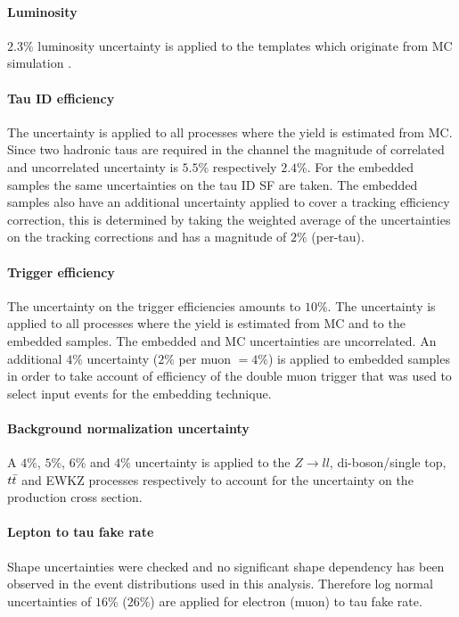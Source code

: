 \paragraph{Luminosity} $2.3 \%$ luminosity uncertainty is applied to the templates which originate from MC simulation \cite{CMS:2018elu}.

\paragraph{Tau ID efficiency} The uncertainty is applied to all processes where the yield is estimated from MC. Since two hadronic taus are required in the \tauh\tauh channel the magnitude of correlated and uncorrelated uncertainty is $5.5\%$ respectively $2.4\%$. For the embedded samples the same uncertainties on the tau ID SF are taken. The embedded samples also have an additional uncertainty applied to cover a tracking efficiency correction, this is determined by taking the weighted average of the uncertainties on the tracking corrections and has a magnitude of $2\%$ (per-tau).

\paragraph{Trigger efficiency} The uncertainty on the trigger efficiencies amounts to $10\%$. The uncertainty is applied to all processes where the yield is estimated from MC and to the embedded samples. The embedded and MC uncertainties are uncorrelated. An additional $4\%$ uncertainty ($2\%$ per muon $= 4\%$) is applied to embedded samples in order to take account of efficiency of the double muon trigger that was used to select input events for the embedding technique.

\paragraph{Background normalization uncertainty} A $4\%$, $5\%$, $6\%$ and $4\%$ uncertainty is applied to the $Z\rightarrow ll$, di-boson/single top, $t\Bar{t}$ and EWKZ processes respectively to account for the uncertainty on the production cross section. 

\paragraph{Lepton to tau fake rate} Shape uncertainties were checked and no significant shape dependency has been observed in the event distributions used in this analysis. Therefore log normal uncertainties of $16\%$ ($26\%$) are applied for electron (muon) to tau fake rate.

